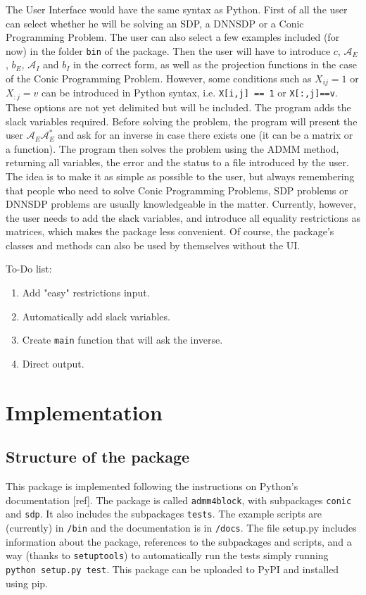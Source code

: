 \documentclass[paper=a4, fontsize=11pt]{scrartcl}
\numberwithin{equation}{section}		%
\numberwithin{figure}{section}			%
\numberwithin{table}{section}				%
\begin{document}
The User Interface would have the same syntax as Python. First of all the user can select whether he will be solving an SDP, a DNNSDP or a Conic Programming Problem. The user can also select a few examples included (for now) in the folder \texttt{bin} of the package. Then the user will have to introduce $c$, $\mathcal{A}_E$, $b_E$, $\mathcal{A}_I$ and $b_I$ in the correct form, as well as the projection functions in the case of the Conic Programming Problem. However, some conditions such as $X_{ij} = 1$ or $X_{:j} = v$ can be introduced in Python syntax, i.e. \texttt{X[i,j] == 1} or \texttt{X[:,j]==v}. These options are not yet delimited but will be included. The program adds the slack variables required. Before solving the problem, the program will present the user $\mathcal{A}_E\mathcal{A}_E^*$ and ask for an inverse in case there exists one (it can be a matrix or a function). The program then solves the problem using the ADMM method, returning all variables, the error and the status to a file introduced by the user. The idea is to make it as simple as possible to the user, but always remembering that people who need to solve Conic Programming Problems, SDP problems or DNNSDP problems are usually knowledgeable in the matter. Currently, however, the user needs to add the slack variables, and introduce all equality restrictions as matrices, which makes the package less convenient. Of course, the package's classes and methods can also be used by themselves without the UI.

To-Do list:
\begin{enumerate}
\item Add "easy" restrictions input.
\item Automatically add slack variables.
\item Create \texttt{main} function that will ask the inverse.
\item Direct output.
\end{enumerate}

\section{Implementation}
\subsection{Structure of the package}
This package is implemented following the instructions on Python's documentation [ref]. The package is called \texttt{admm4block}, with subpackages \texttt{conic} and \texttt{sdp}. It also includes the subpackages \texttt{tests}. The example scripts are (currently) in \texttt{/bin} and the documentation is in \texttt{/docs}. The file setup.py includes information about the package, references to the subpackages and scripts, and a way (thanks to \texttt{setuptools}) to automatically run the tests simply running \texttt{python setup.py test}. This package can be uploaded to PyPI and installed using pip.
\end{document}

